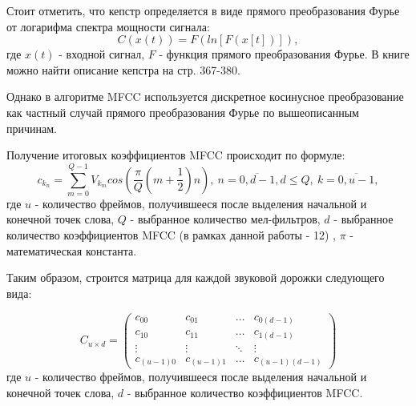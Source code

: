 Стоит отметить, что кепстр определяется в виде прямого преобразования Фурье от логарифма спектра мощности сигнала:
\begin{equation}
	C(x(t))=F(ln[F(x[t])]),
\end{equation}
где $x(t)$ - входной сигнал, $F$ - функция прямого преобразования Фурье. В книге \cite{CeptrumExplanation} можно найти описание кепстра на стр. 367-380. 

Однако в алгоритме MFCC используется дискретное косинусное преобразование как частный случай прямого преобразования Фурье по вышеописанным причинам.

Получение итоговых коэффициентов MFCC происходит по формуле:
\begin{equation}
	c_{k_n} = \sum_{m=0}^{Q-1} V_{k_m} cos(\dfrac{\pi}{Q} (m+\dfrac{1}{2})n),~n=\overline{0,d-1},d \le Q,~k=\overline{0,u-1},
\end{equation}
где $u$ - количество фреймов, получившееся после выделения начальной и конечной точек слова, $Q$ - выбранное количество мел-фильтров, $d$ - выбранное количество коэффициентов MFCC (в рамках данной работы - 12) \cite{MFCC}, $\pi$ - математическая константа.

Таким образом, строится матрица для каждой звуковой дорожки следующего вида:

\begin{equation*}
	C_{u \times d} = \left(
	\begin{array}{cccc}
		c_{00} & c_{01} & \ldots & c_{0(d-1)}\\
		c_{10} &  c_{11} & \ldots & c_{1(d-1)}\\
		\vdots & \vdots & \ddots & \vdots\\
		c_{(u-1)0} & c_{(u-1)1} & \ldots & c_{(u-1)(d-1)}
	\end{array}
	\right)
\end{equation*}
где $u$ - количество фреймов, получившееся после выделения начальной и конечной точек слова, $d$ - выбранное количество коэффициентов MFCC.

\label{par:unify_coeffs}
